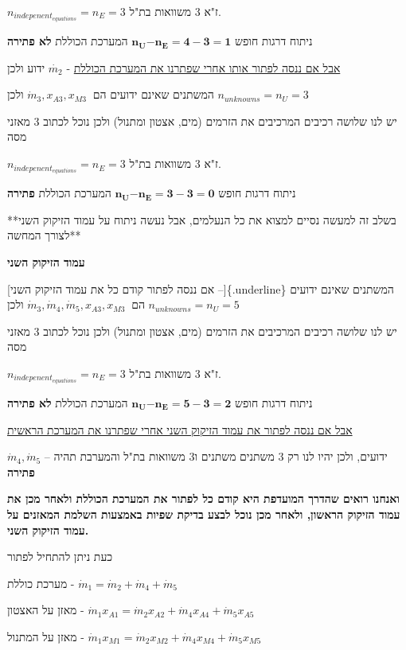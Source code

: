 \documentclass[
  hebrew,
  letterpaper,
  DIV=11,
  numbers=noendperiod]{scrreprt}
\begin{document}
\(n_{indepenent_{equations}} = n_{E} = 3\) ז"א 3 משוואות בת"ל.

ניתוח דרגות חופש
\(\mathbf{n}_{\mathbf{U}}\mathbf{-}\mathbf{n}_{\mathbf{E}}\mathbf{= 4 - 3 = 1}\)
המערכת הכוללת \textbf{לא פתירה}

\ul{אבל אם ננסה לפתור אותו אחרי שפתרנו את המערכת הכוללת} -
\(\dot{m_{2}}\) ידוע ולכן

המשתנים שאינם ידועים הם \({\dot{m}}_{3},x_{A3},x_{M3}\ \) ולכן
\(n_{unknowns} = n_{U} = 3\)

יש לנו שלושה רכיבים המרכיבים את הזרמים (מים, אצטון ומתנול) ולכן נוכל
לכתוב 3 מאזני מסה

\(n_{indepenent_{equations}} = n_{E} = 3\) ז"א 3 משוואות בת"ל.

ניתוח דרגות חופש
\(\mathbf{n}_{\mathbf{U}}\mathbf{-}\mathbf{n}_{\mathbf{E}}\mathbf{= 3 - 3 = 0}\)
המערכת הכוללת \textbf{פתירה}

**בשלב זה למעשה נסיים למצוא את כל הנעלמים, אבל נעשה ניתוח על עמוד הזיקוק
השני לצורך המחשה**

\textbf{עמוד הזיקוק השני}

{[}אם ננסה לפתור קודם כל את עמוד הזיקוק השני --{]}\{.underline\} המשתנים
שאינם ידועים הם
\({\dot{m}}_{3},{\dot{m}}_{4},{\dot{m}}_{5},x_{A3},x_{M3}\ \) ולכן
\(n_{unknowns} = n_{U} = 5\)

יש לנו שלושה רכיבים המרכיבים את הזרמים (מים, אצטון ומתנול) ולכן נוכל
לכתוב 3 מאזני מסה

\(n_{indepenent_{equations}} = n_{E} = 3\) ז"א 3 משוואות בת"ל.

ניתוח דרגות חופש
\(\mathbf{n}_{\mathbf{U}}\mathbf{-}\mathbf{n}_{\mathbf{E}}\mathbf{= 5 - 3 = 2}\)
המערכת הכוללת \textbf{לא פתירה}

\ul{אבל אם ננסה לפתור את עמוד הזיקוק השני אחרי שפתרנו את המערכת הראשית}

\({\dot{m}}_{4},{\dot{m}}_{5}\) -- ידועים, ולכן יהיו לנו רק 3 משתנים
משתנים ו3 משוואות בת"ל והמערבת תהיה \textbf{פתירה}

\textbf{ואנחנו רואים שהדרך המועדפת היא קודם כל לפתור את המערכת הכוללת
ולאחר מכן את עמוד הזיקוק הראשון, ולאחר מכן נוכל לבצע בדיקת שפיות באמצעות
השלמת המאזנים על עמוד הזיקוק השני.}

כעת ניתן להתחיל לפתור

מערכת כוללת -
\({\dot{m}}_{1} = {\dot{m}}_{2} + {\dot{m}}_{4} + {\dot{m}}_{5}\)

מאזן על האצטון -
\({\dot{m}}_{1}x_{A1} = {\dot{m}}_{2}x_{A2} + {\dot{m}}_{4}x_{A4} + {\dot{m}}_{5}x_{A5}\)

מאזן על המתנול -
\({\dot{m}}_{1}x_{M1} = {\dot{m}}_{2}x_{M2} + {\dot{m}}_{4}x_{M4} + {\dot{m}}_{5}x_{M5}\)
\end{document}
